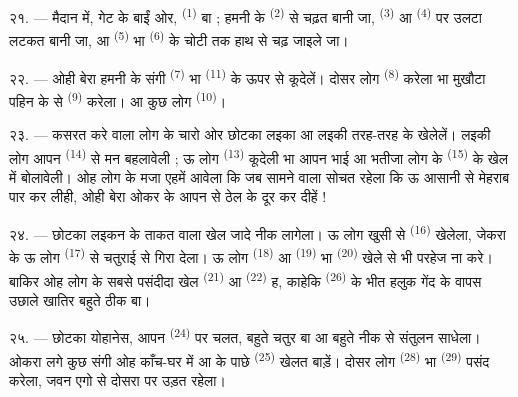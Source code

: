 २१. --- मैदान में, गेट के बाईं ओर, 
\textsuperscript{(1)} बा ; हमनी के  \textsuperscript{(2)}
से चढ़त बानी जा,  \textsuperscript{(3)} आ
 \textsuperscript{(4)} पर उलटा लटकत बानी जा, आ
 \textsuperscript{(5)} भा  \textsuperscript{(6)} के चोटी तक हाथ से चढ़ जाइले जा।

२२. --- ओही बेरा हमनी के संगी 
\textsuperscript{(7)} भा  \textsuperscript{(11)} के
ऊपर से कूदेलें। दोसर लोग  \textsuperscript{(8)} करेला
भा मुखौटा पहिन के  से 
\textsuperscript{(9)} करेला। आ कुछ लोग 
\textsuperscript{(10)}।

\VUsaut{4.6mm}
\VUsaut{3.0mm}

२३. --- कसरत करे वाला लोग के चारो ओर छोटका लइका आ लइकी तरह-तरह के
 खेलेलें। लइकी लोग आपन  \textsuperscript{(14)}
से मन बहलावेली ; ऊ लोग  \textsuperscript{(13)} कूदेली भा
आपन भाई आ भतीजा लोग के  \textsuperscript{(15)} के खेल में
बोलावेली। ओह लोग के मजा एहमें आवेला कि जब सामने वाला सोचत रहेला कि ऊ
आसानी से मेहराब पार कर लीही, ओही बेरा ओकर  के आपन
 से ठेल के दूर कर दीहें !

२४. --- छोटका लइकन के ताकत वाला खेल जादे नीक लागेला। ऊ लोग खुसी से
 \textsuperscript{(16)} खेलेला, जेकरा के ऊ लोग
 \textsuperscript{(17)} से चतुराई से गिरा देला। ऊ लोग
 \textsuperscript{(18)} आ 
\textsuperscript{(19)} भा  \textsuperscript{(20)} खेले
से भी परहेज ना करे। बाकिर ओह लोग के सबसे पसंदीदा खेल 
\textsuperscript{(21)} आ  \textsuperscript{(22)} ह,
काहेकि  \textsuperscript{(26)} के भीत हलुक गेंद के वापस
उछाले खातिर बहुते ठीक बा।

२५. --- छोटका योहानेस, आपन  \textsuperscript{(24)} पर
चलत, बहुते चतुर बा आ बहुते नीक से संतुलन साधेला। ओकरा लगे कुछ संगी ओह
काँच-घर में आ  के पाछे 
\textsuperscript{(25)} खेलत बाड़ें। दोसर लोग 
\textsuperscript{(28)} भा  \textsuperscript{(29)} पसंद
करेला, जवन एगो  से दोसरा पर उड़त रहेला।

